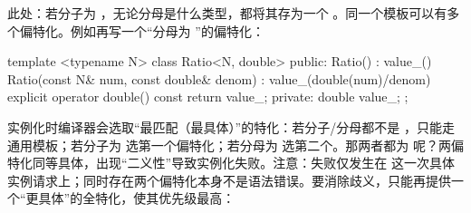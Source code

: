 此处：若分子为 ，无论分母是什么类型，都将其存为一个 。同一个模板可以有多个偏特化。例如再写一个“分母为 ”的偏特化：

\begin{code}
template <typename N> class Ratio<N, double> {
  public:
  Ratio() : value_() {}
  Ratio(const N& num, const double& denom) :
    value_(double(num)/denom) {}
  explicit operator double() const { return value_; }
  private:
  double value_;
};
\end{code}

实例化时编译器会选取“最匹配（最具体）”的特化：若分子/分母都不是 ，只能走通用模板；若分子为  选第一个偏特化；若分母为  选第二个。那两者都为  呢？两偏特化同等具体，出现“二义性”导致实例化失败。注意：失败仅发生在  这一次具体实例请求上；同时存在两个偏特化本身不是语法错误。要消除歧义，只能再提供一个“更具体”的全特化，使其优先级最高：

